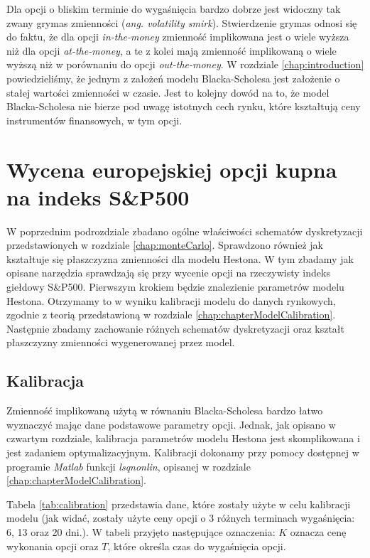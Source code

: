 \documentclass{pracamgr}
\begin{document}
Dla opcji o bliskim terminie do wygaśnięcia bardzo dobrze jest widoczny
tak zwany grymas zmienności (\textit{ang. volatility smirk}). Stwierdzenie grymas 
odnosi się do faktu, że dla opcji \textit{in-the-money} zmienność implikowana jest o 
wiele wyższa niż dla opcji \textit{at-the-money}, a te z kolei mają zmienność 
implikowaną o wiele wyższą niż w porównaniu do opcji \textit{out-the-money}.
W rozdziale \ref{chap:introduction} powiedzieliśmy, że jednym z założeń
modelu Blacka-Scholesa jest założenie o stałej wartości zmienności w czasie. 
Jest to kolejny dowód na to, że model Blacka-Scholesa nie bierze pod uwagę
istotnych cech rynku, które kształtują ceny instrumentów finansowych, w tym opcji.




\section{Wycena europejskiej opcji kupna na indeks S\&P500}

W poprzednim podrozdziale zbadano ogólne właściwości schematów dyskretyzacji przedstawionych
w rozdziale \ref{chap:monteCarlo}. Sprawdzono również jak kształtuje się płaszczyzna 
zmienności dla modelu Hestona. 
W tym zbadamy jak opisane narzędzia sprawdzają się przy wycenie opcji na rzeczywisty indeks 
giełdowy S\&P500.
Pierwszym krokiem będzie znalezienie parametrów modelu Hestona. Otrzymamy to w wyniku 
kalibracji modelu do danych rynkowych, zgodnie z teorią 
przedstawioną w rozdziale \ref{chap:chapterModelCalibration}.
Następnie zbadamy zachowanie różnych schematów dyskretyzacji oraz kształt płaszczyzny
zmienności wygenerowanej przez model.




\subsection{Kalibracja}

Zmienność implikowaną użytą w równaniu Blacka-Scholesa 
bardzo łatwo wyznaczyć mając dane podstawowe parametry 
opcji. Jednak, jak opisano w czwartym rozdziale, 
kalibracja parametrów modelu Hestona jest skomplikowana i jest
zadaniem optymalizacyjnym. Kalibracji dokonamy przy pomocy dostępnej w 
programie \textit{Matlab} funkcji \textit{lsqnonlin}, 
opisanej w rozdziale \ref{chap:chapterModelCalibration}.


Tabela \ref{tab:calibration} przedstawia dane, które
zostały użyte w celu kalibracji modelu (jak widać, zostały użyte ceny 
opcji o 3 różnych terminach wygaśnięcia: 
6, 13 oraz 20 dni.). W tabeli przyjęto następujące oznaczenia: $K$ oznacza cenę wykonania opcji
oraz $T$, które określa czas do wygaśnięcia opcji.
\end{document}

